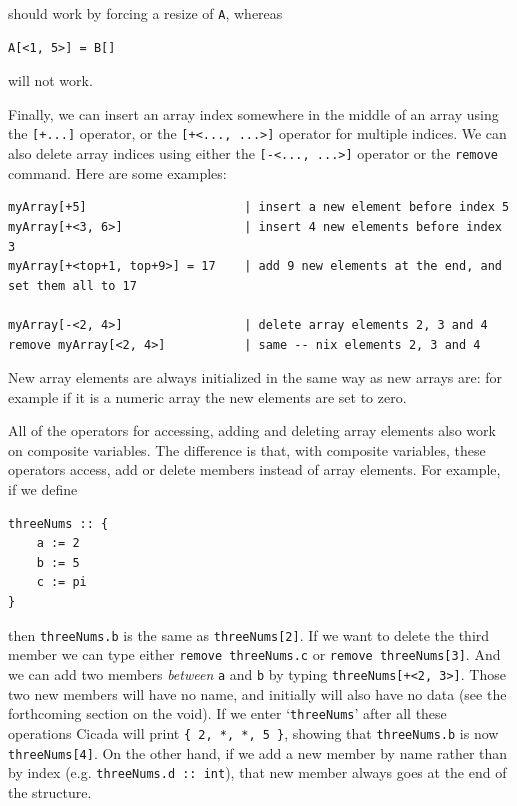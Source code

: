 \documentclass{article}
\newenvironment{code}{
       \begin{list}{}{
               \setlength{\leftmargin}{.4in}
               \setlength{\rightmargin}{0in}
               \setlength{\topsep}{.2in}
       }
       \small
       \item[] }
       { \end{list}   }
\begin{document}
\noindent should work by forcing a resize of \verb#A#, whereas

\begin{code} \begin{verbatim}
A[<1, 5>] = B[]
\end{verbatim} \end{code}

\noindent will not work.

Finally, we can insert an array index somewhere in the middle of an array using the \verb#[+...]# operator, or the \verb#[+<..., ...>]# operator for multiple indices.  We can also delete array indices using either the \verb#[-<..., ...>]# operator or the \verb#remove# command.  Here are some examples:

\begin{code} \begin{verbatim}
myArray[+5]                      | insert a new element before index 5
myArray[+<3, 6>]                 | insert 4 new elements before index 3
myArray[+<top+1, top+9>] = 17    | add 9 new elements at the end, and set them all to 17

myArray[-<2, 4>]                 | delete array elements 2, 3 and 4
remove myArray[<2, 4>]           | same -- nix elements 2, 3 and 4
\end{verbatim} \end{code}

\noindent New array elements are always initialized in the same way as new arrays are:  for example if it is a numeric array the new elements are set to zero.

All of the operators for accessing, adding and deleting array elements also work on composite variables.  The difference is that, with composite variables, these operators access, add or delete members instead of array elements.  For example, if we define

\begin{code} \begin{verbatim}
threeNums :: {
    a := 2
    b := 5
    c := pi
}
\end{verbatim} \end{code}

\noindent then \verb#threeNums.b# is the same as \verb#threeNums[2]#.  If we want to delete the third member we can type either \verb#remove threeNums.c# or \verb#remove threeNums[3]#.  And we can add two members \emph{between} \verb#a# and \verb#b# by typing \verb#threeNums[+<2, 3>]#.  Those two new members will have no name, and initially will also have no data (see the forthcoming section on the void).  If we enter `\verb#threeNums#' after all these operations Cicada will print \verb#{ 2, *, *, 5 }#, showing that \verb#threeNums.b# is now \verb#threeNums[4]#.  On the other hand, if we add a new member by name rather than by index (e.g. \verb#threeNums.d :: int#), that new member always goes at the end of the structure.
\end{document}
